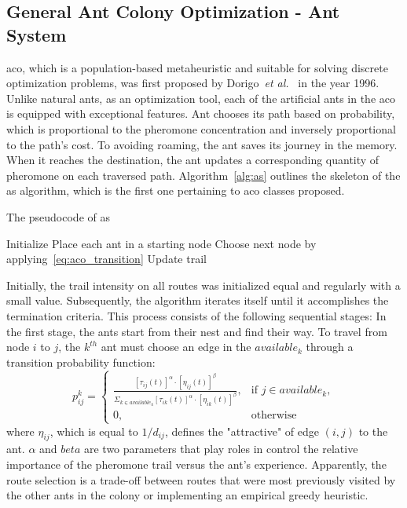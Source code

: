 \subsection{General Ant Colony Optimization - Ant System}
\acrfull{aco}, which is a population-based metaheuristic and suitable for solving discrete optimization problems, was first proposed by Dorigo~\textit{et al.}~\cite{dorigo1996ant} in the year 1996. Unlike natural ants, as an optimization tool, each of the artificial ants in the \gls{aco} is equipped with exceptional features. Ant chooses its path based on probability, which is proportional to the pheromone concentration and inversely proportional to the path's cost. To avoiding roaming, the ant saves its journey in the memory. When it reaches the destination, the ant updates a corresponding quantity of pheromone on each traversed path. Algorithm~\ref{alg:as} outlines the skeleton of the \gls{as} algorithm, which is the first one pertaining to \gls{aco} classes proposed.

\begin{algorithm}
	\caption{The pseudocode of \gls{as}}
	\label{alg:as}
	\Begin
	{	
		Initialize 
		{
			Place each ant in a starting node\;
			{
				{
					Choose next node by applying~\ref{eq:aco_transition} \;
					Update trail\;
				}
			}
		}
	}
\end{algorithm}

Initially, the trail intensity on all routes was initialized equal and regularly with a small value. Subsequently, the algorithm iterates itself until it accomplishes the termination criteria. This process consists of the following sequential stages: In the first stage, the ants start from their nest and find their way. To travel from node $i$ to $j$, the $k^{th}$ ant must choose an edge in the $available_k$ through a transition probability function:
\begin{equation}
\label{eq:aco_transition}
p^k_{ij} =
\begin{cases}
	\frac{[\tau_{ij}(t)]^{\alpha} \cdot [\eta_{ij}(t)]^{\beta}} {\Sigma_{k \in available_k} [\tau_{ik}(t)]^{\alpha}\cdot [\eta_{ik}(t)]^{\beta}}, & \text{if $j \in available_k$}, \\
	0, & \text{otherwise}
\end{cases}
\end{equation}
where $\eta_{ij}$, which is equal to $1/d_{ij}$, defines the "attractive" of edge $(i,j)$ to the ant. $\alpha$ and $beta$ are two parameters that play roles in control the relative importance of the pheromone trail versus the ant's experience. Apparently, the route selection is a trade-off between routes that were most previously visited by the other ants in the colony or implementing an empirical greedy heuristic. 

